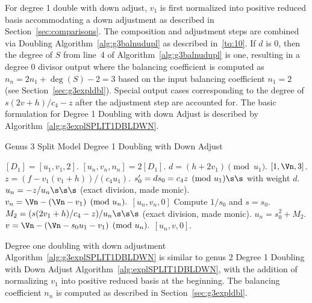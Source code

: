 For degree 1 double with down adjust, $v_1$ is
first normalized into positive reduced basis accommodating a down adjustment as
described in Section~\ref{sec:comparisons}. The composition and adjustment steps
are combined via Doubling Algorithm~\ref{alg:g3balnudupl} as described
in~\ref{tq:10}. If $d$ is 0, then the degree of $S$ from line~4 of
Algorithm~\ref{alg:g3balnudupl} is one, resulting in a degree 0 divisor output
where the balancing coefficient is computed as $n_n = 2n_1 + \deg(S) - 2 = 3$ based
on the input balancing coefficient $n_1 = 2$ (see Section~\ref{sec:g3expldbl}).
Special output cases corresponding to the degree of $s(2v + h)/c_4 - z$ after
the adjustment step are accounted for. The basic formulation for Degree 1
Doubling with down Adjust is described by
Algorithm~\ref{alg:g3explSPLIT1DBLDWN}. 
\begin{algorithm}[htbp]
\caption{Genus 3 Split Model Degree 1 Doubling with Down Adjust \label{alg:g3explSPLIT1DBLDWN}}
\begin{algorithmic} [1]
\Require $[D_1] = [u_1,v_1,2]$.  \smallskip
\Ensure $[u_n,v_n,n_n] = 2[D_1]$.
\algrule
\State
\State $d = (h + 2v_1) \pmod{u_1}$.
 \Return $[1,\Vn,3]$.
\EndIf
\State $z = (f - v_1(v_1 + h))/(c_4u_1)$.
\State $s_0' = ds_0 = c_4z \pmod{u_1} \s\s$ with weight $d$.
    \State $u_n = -z/u_n \s\s\s$ (exact division, made monic).
    \State $v_n = \Vn - (\Vn - v_1)  \pmod{u_n}.$
    \State \Return $[u_n,v_n,0]$
\EndIf
\State Compute $1/s_0$ and $s = s_0$.
\State $M_2 = (s(2v_1 + h)/c_4 - z)/u_n \s\s\s $ (exact division, made monic).
\State $u_n = s_0^2 + M_2$.
\State $v = \Vn - (\Vn - s_0u_1 - v_1)  \pmod{u_n}.$
\State \Return $[u_n,v,0]$.
\end{algorithmic}
\end{algorithm}
Degree one doubling with down adjustment Algorithm~\ref{alg:g3explSPLIT1DBLDWN}
is similar to genus 2 Degree 1 Doubling with Down Adjust
Algorithm~\ref{alg:explSPLIT1DBLDWN}, with the addition of normalizing $v_1$
into positive reduced basis at the beginning. The balancing coefficient $n_n$ is
computed as described in Section~\ref{sec:g3expldbl}.

